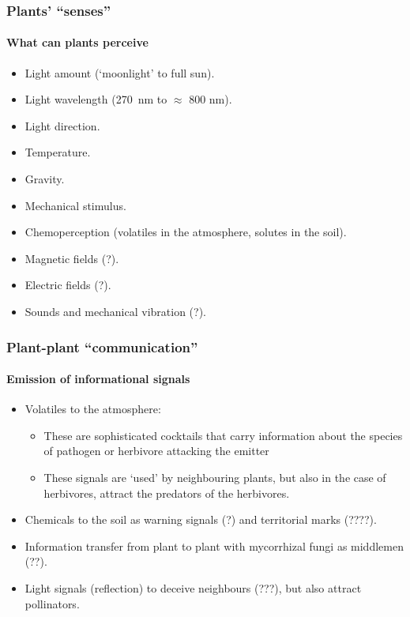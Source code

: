 \documentclass[utf8]{beamer}\usepackage[]{graphicx}\usepackage[]{color} %
\begin{document}
\begin{frame}[<+->]
  \frametitle{Plants' ``senses''}
  \framesubtitle{What can plants perceive}
  \begin{itemize}
    \item Light amount (`moonlight' to full sun).
    \item Light wavelength (270~nm to $\approx$ 800 nm).
    \item Light direction.
    \item Temperature.
    \item Gravity.
    \item Mechanical stimulus.
    \item Chemoperception (volatiles in the atmosphere, solutes in the soil).
    \item Magnetic fields (?).
    \item Electric fields (?).
    \item Sounds and mechanical vibration (?).
  \end{itemize}
\end{frame}

\begin{frame}[<+->]
  \frametitle{Plant-plant ``communication''}
  \framesubtitle{Emission of informational signals}
  \begin{itemize}
    \item Volatiles to the atmosphere:
    \begin{itemize}
      \item These are sophisticated cocktails that carry information about the species of
      pathogen or herbivore attacking the emitter
      \item These signals are `used' by neighbouring plants, but also in the case of herbivores,
      attract the predators of the herbivores.
    \end{itemize}
    \item Chemicals to the soil as warning signals (?) and territorial marks (????).
    \item Information transfer from plant to plant with mycorrhizal fungi as middlemen (??).
    \item Light signals (reflection) to deceive neighbours (???), but also attract pollinators.
  \end{itemize}
\end{frame}
\end{document}
